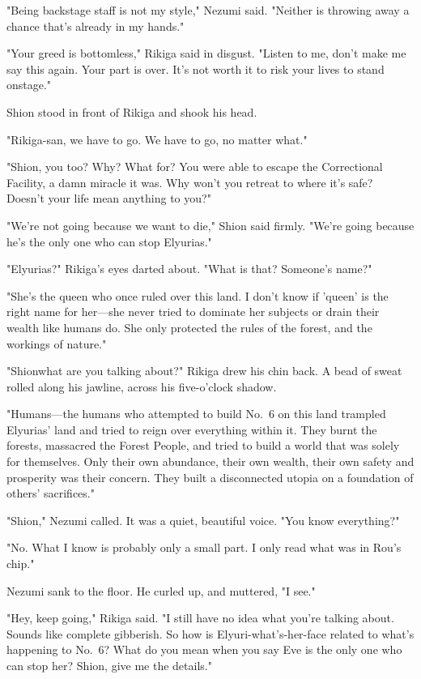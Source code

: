 "Being backstage staff is not my style," Nezumi said. "Neither is
throwing away a chance that's already in my hands."

"Your greed is bottomless," Rikiga said in disgust. "Listen to me, don't
make me say this again. Your part is over. It's not worth it to risk
your lives to stand onstage."

Shion stood in front of Rikiga and shook his head.

"Rikiga-san, we have to go. We have to go, no matter what."

"Shion, you too? Why? What for? You were able to escape the Correctional
Facility, a damn miracle it was. Why won't you retreat to where it's
safe? Doesn't your life mean anything to you?"

"We're not going because we want to die," Shion said firmly. "We're
going because he's the only one who can stop Elyurias."

"Elyurias?" Rikiga's eyes darted about. "What is that? Someone's name?"

"She's the queen who once ruled over this land. I don't know if 'queen'
is the right name for her---she never tried to dominate her subjects or
drain their wealth like humans do. She only protected the rules of the
forest, and the workings of nature."

"Shion\el what are you talking about?" Rikiga drew his chin back. A bead
of sweat rolled along his jawline, across his five-o'clock shadow.

"Humans---the humans who attempted to build No.~6 on this land trampled
Elyurias' land and tried to reign over everything within it. They burnt
the forests, massacred the Forest People, and tried to build a world
that was solely for themselves. Only their own abundance, their own
wealth, their own safety and prosperity was their concern. They built a
disconnected utopia on a foundation of others' sacrifices."

"Shion," Nezumi called. It was a quiet, beautiful voice. "You know
everything?"

"No. What I know is probably only a small part. I only read what was in
Rou's chip."

Nezumi sank to the floor. He curled up, and muttered, "I see."

"Hey, keep going," Rikiga said. "I still have no idea what you're
talking about. Sounds like complete gibberish. So how is
Elyuri-what's-her-face related to what's happening to No.~6? What do you
mean when you say Eve is the only one who can stop her? Shion, give me
the details."


